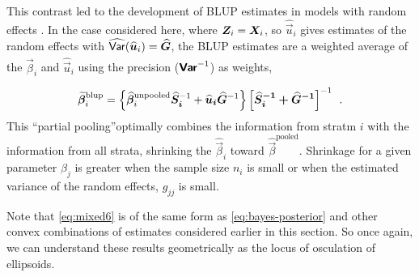 This contrast led to the development of BLUP estimates in models with random effects \citep{Henderson:1975,Robinson:1991,Speed:1991}.
In the case considered here, where $\bm{Z}_i = \bm{X}_i$, so $\widehat{\vec{u}}_i$ gives estimates of the random effects with
$\widehat{\mathsf{Var}} (\widehat{\bm{u}}_i) = \widehat{\bm{G}}$, the BLUP estimates are a weighted average of the $\widehat{\vec{\beta}}_i$
and $\widehat{\vec{u}}_i$ using the precision ($\bm{\mathsf{Var}}^{-1}$) as weights,

\begin{equation}\label{eq:mixed6}
 \widetilde{\bm{\beta}}^{\textrm{blup}}_i = 
 \left\lbrace
   \widehat{\bm{\beta}}^{\textrm{unpooled}}_i \bm{\widehat{\bm{S}}_i}^{-1}  + \bm{\widehat{\bm{u}}_i \widehat{\bm{G}}}^{-1}
 \right\rbrace
 \bm{ \left[ \bm{\widehat{\bm{S}}_i}^{-1} + \bm{\widehat{\bm{G}}}^{-1} \right] }^{-1} \:\: .
\end{equation}
This ``partial pooling''optimally combines the information from stratm $i$ with the information from all strata,
shrinking the $\widehat{\vec{\beta}}_i$ toward $\widehat{\vec{\beta}}^{\textrm{pooled}}$. Shrinkage 
for a given parameter $\beta_j$ is greater
when the sample size $n_i$ is small or when the estimated variance of the random effects, $g_{jj}$ is small.

Note that \eqref{eq:mixed6}
is of the same form as \eqref{eq:bayes-posterior} and other convex combinations of estimates considered
earlier in this section. So once again, we can understand these results geometrically as the locus of
osculation of ellipsoids.


